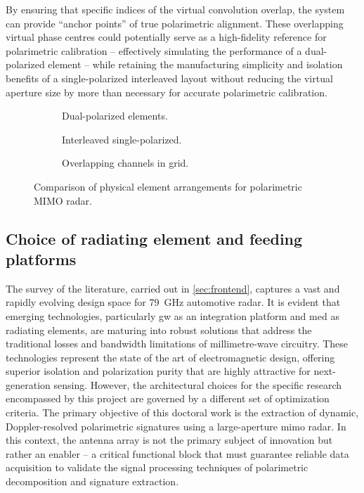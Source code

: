By ensuring that specific indices of the virtual convolution overlap, the system can provide \enquote{anchor points} of true polarimetric alignment.
These overlapping virtual phase centres could potentially serve as a high-fidelity reference for polarimetric calibration -- effectively simulating the performance of a dual-polarized element -- while retaining the manufacturing simplicity and isolation benefits of a single-polarized interleaved layout without reducing the virtual aperture size by more than necessary for accurate polarimetric calibration.

\begin{figure}[!ht]
    \centering
    \begin{subfigure}{0.32\textwidth}
        \centering
        
        \caption{Dual-polarized elements.}
        \label{fig:dual_pol_elements}
    \end{subfigure}
    \hfill
    \begin{subfigure}{0.32\textwidth}
        \centering
        
        \caption{Interleaved single-polarized.}
        \label{fig:interleaved_single_pol_elements}
    \end{subfigure}
    \hfill
    \begin{subfigure}{0.33\textwidth}
        \centering
        
        \caption{Overlapping channels in grid.}
        \label{fig:overlapping_single_pol_elements}
    \end{subfigure}
    \caption{Comparison of physical element arrangements for polarimetric MIMO radar.}
    \label{fig:mimo_element_arrangements}
\end{figure}


\subsection{Choice of radiating element and feeding platforms}
\label{sec:element-choice}

The survey of the literature, carried out in \cref{sec:frontend}, captures a vast and rapidly evolving design space for \qty{79}{GHz} automotive radar.
It is evident that emerging technologies, particularly \gls{gw} as an integration platform and \gls{med} as radiating elements, are maturing into robust solutions that address the traditional losses and bandwidth limitations of millimetre-wave circuitry.
These technologies represent the state of the art of electromagnetic design, offering superior isolation and polarization purity that are highly attractive for next-generation sensing.
However, the architectural choices for the specific research encompassed by this project are governed by a different set of optimization criteria.
The primary objective of this doctoral work is the extraction of dynamic, Doppler-resolved polarimetric signatures using a large-aperture \gls{mimo} radar.
In this context, the antenna array is not the primary subject of innovation but rather an enabler -- a critical functional block that must guarantee reliable data acquisition to validate the signal processing techniques of polarimetric decomposition and signature extraction.

